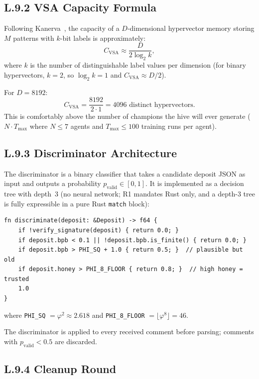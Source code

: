 \subsection*{L.9.2 \quad VSA Capacity Formula}

Following Kanerva~\cite{kanerva_hyperdimensional}, the capacity of a
$D$-dimensional hypervector memory storing $M$ patterns with $k$-bit
labels is approximately:
\begin{equation}
  C_{\text{VSA}} \approx \frac{D}{2 \log_{2} k},
  \label{eq:vsa-cap}
\end{equation}
where $k$ is the number of distinguishable label values per dimension
(for binary hypervectors, $k = 2$, so $\log_{2} k = 1$ and
$C_{\text{VSA}} \approx D/2$).

For $D = 8192$:
\[
  C_{\text{VSA}} = \frac{8192}{2 \cdot 1} = 4096 \text{ distinct hypervectors.}
\]
This is comfortably above the number of champions the hive will ever
generate ($N \cdot T_{\text{max}}$ where $N \leq 7$ agents and
$T_{\text{max}} \leq 100$ training runs per agent).

\subsection*{L.9.3 \quad Discriminator Architecture}

The discriminator is a binary classifier that takes a candidate
deposit JSON as input and outputs a probability $p_{\text{valid}}
\in [0,1]$.  It is implemented as a decision tree with depth~3 (no
neural network; R1 mandates Rust only, and a depth-3 tree is fully
expressible in a pure Rust \texttt{match} block):

\begin{verbatim}
fn discriminate(deposit: &Deposit) -> f64 {
    if !verify_signature(deposit) { return 0.0; }
    if deposit.bpb < 0.1 || !deposit.bpb.is_finite() { return 0.0; }
    if deposit.bpb > PHI_SQ + 1.0 { return 0.5; }  // plausible but old
    if deposit.honey > PHI_8_FLOOR { return 0.8; }  // high honey = trusted
    1.0
}
\end{verbatim}

where \texttt{PHI\_SQ} $= \varphi^{2} \approx 2.618$ and
\texttt{PHI\_8\_FLOOR} $= \lfloor \varphi^{8} \rfloor = 46$.

\noindent The discriminator is applied to every received comment before
parsing; comments with $p_{\text{valid}} < 0.5$ are discarded.

\subsection*{L.9.4 \quad Cleanup Round}

